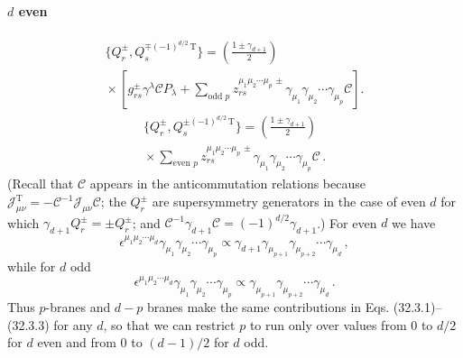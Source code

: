 \paragraph{\(d\) even}
\begin{multline}
  \{Q_r^\pm,Q_s^{\mp(-1)^{d/2}\,\mathrm T}\}
  =\left(\frac{1\pm\gamma_{d+1}}{2}\right)\\
  {}\times
  \left[
    g_{rs}^\pm\gamma^\lambda\mathcal C P_\lambda
    +\sum_{\text{odd }p}
      z_{rs}^{\mu_1\mu_2\cdots\mu_p\,\pm}
      \gamma_{\mu_1}\gamma_{\mu_2}\cdots\gamma_{\mu_p}\mathcal C
  \right].
  \tag{32.3.3}\label{eq:32.3.3}
\end{multline}
\begin{multline}
  \{Q_r^\pm,Q_s^{\pm(-1)^{d/2}\,\mathrm T}\}
  =\left(\frac{1\pm\gamma_{d+1}}{2}\right)\\
  {}\times
    \sum_{\text{even }p}
      z_{rs}^{\mu_1\mu_2\cdots\mu_p\,\pm}
      \gamma_{\mu_1}\gamma_{\mu_2}\cdots\gamma_{\mu_p}\mathcal C\,.
  \tag{32.3.4}\label{eq:32.3.4}
\end{multline}
(Recall that \(\mathcal C\) appears in the anticommutation relations
because
\(\mathscr J_{\mu\nu}^{\mathrm T}
=-\mathcal C^{-1}\mathscr J_{\mu\nu}\mathcal C\); the \(Q_r^\pm\) are
supersymmetry generators in the case of even \(d\) for which
\(\gamma_{d+1}Q_r^\pm=\pm Q_r^\pm\); and
\(\mathcal C^{-1}\gamma_{d+1}\mathcal C
=(-1)^{d/2}\gamma_{d+1}\).) For even \(d\) we have
\[
  \epsilon^{\mu_1\mu_2\cdots\mu_d}
  \gamma_{\mu_1}\gamma_{\mu_2}\cdots\gamma_{\mu_p}
  \mathrel{\propto}
  \gamma_{d+1}\gamma_{\mu_{p+1}}\gamma_{\mu_{p+2}}
  \cdots\gamma_{\mu_d}\,,
\]
while for \(d\) odd
\[
  \epsilon^{\mu_1\mu_2\cdots\mu_d}
  \gamma_{\mu_1}\gamma_{\mu_2}\cdots\gamma_{\mu_p}
  \mathrel{\propto}
  \gamma_{\mu_{p+1}}\gamma_{\mu_{p+2}}\cdots\gamma_{\mu_d}\,.
\]
Thus \(p\)-branes and \(d-p\) branes make the same contributions in
Eqs. (32.3.1)--(32.3.3) for any \(d\), so that we can restrict \(p\) to
run only over values from 0 to \(d/2\) for \(d\) even and from 0 to
\((d-1)/2\) for \(d\) odd.

